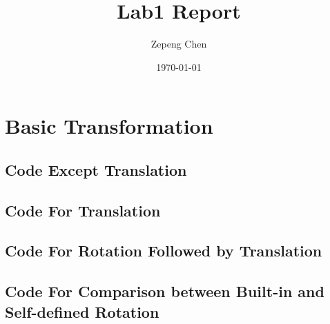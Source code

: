 \documentclass[14pt]{article}
\title{Lab1 Report}
\author{Zepeng Chen}
\date{\today}
\begin{document}
	\maketitle
	\tableofcontents
	\section{Basic Transformation}
	\subsection{Code Except Translation}
	
	\subsection{Code For Translation}
	
	\subsection{Code For Rotation Followed by Translation}
	
	\subsection{Code For Comparison between Built-in and Self-defined Rotation}
	
	\newcommand{\RNum}[1]{\uppercase\expandafter{\romannumeral #1\relax}}
\end{document}
